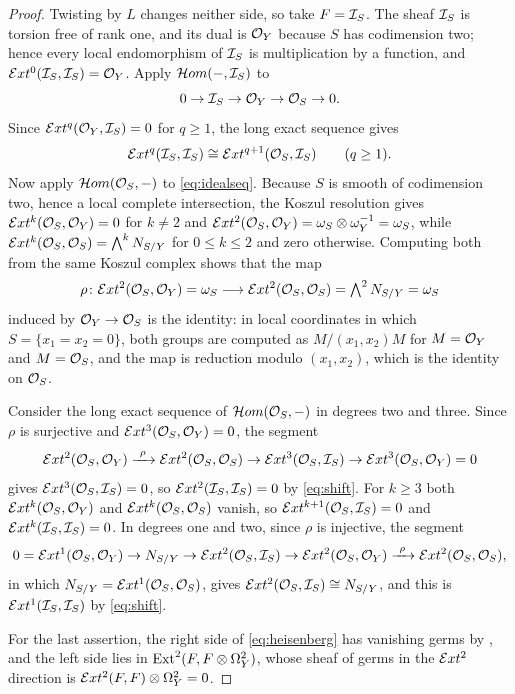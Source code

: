 \begin{proof}
Twisting by $L$ changes neither side, so take $F=\mathcal{I}_{S}$. The sheaf
$\mathcal{I}_{S}$ is torsion free of rank one, and its dual is $\mathcal{O}_{Y}$ because $S$
has codimension two; hence every local endomorphism of $\mathcal{I}_{S}$ is
multiplication by a function, and
$\mathcal{E} xt^{0}(\mathcal{I}_{S},\mathcal{I}_{S})=\mathcal{O}_{Y}$. Apply $\mathcal{H} om(-,\mathcal{I}_{S})$ to
\begin{equation}\label{eq:idealseq}
  0\to\mathcal{I}_{S}\to\mathcal{O}_{Y}\to\mathcal{O}_{S}\to0 .
\end{equation}
Since $\mathcal{E} xt^{q}(\mathcal{O}_{Y},\mathcal{I}_{S})=0$ for $q\ge1$, the long exact sequence
gives
\begin{equation}\label{eq:shift}
  \mathcal{E} xt^{q}(\mathcal{I}_{S},\mathcal{I}_{S})\cong\mathcal{E} xt^{q+1}(\mathcal{O}_{S},\mathcal{I}_{S})
  \qquad(q\ge1).
\end{equation}
Now apply $\mathcal{H} om(\mathcal{O}_{S},-)$ to \eqref{eq:idealseq}. Because $S$ is smooth of
codimension two, hence a local complete intersection, the Koszul resolution
gives $\mathcal{E} xt^{k}(\mathcal{O}_{S},\mathcal{O}_{Y})=0$ for $k\ne2$ and
$\mathcal{E} xt^{2}(\mathcal{O}_{S},\mathcal{O}_{Y})=\omega_{S}\otimes\omega_{Y}^{-1}=\omega_{S}$,
while $\mathcal{E} xt^{k}(\mathcal{O}_{S},\mathcal{O}_{S})=\bigwedge^{k}N_{S/Y}$ for $0\le k\le2$ and
zero otherwise. Computing both from the same Koszul complex shows that the
map
\[
  \rho\colon\mathcal{E} xt^{2}(\mathcal{O}_{S},\mathcal{O}_{Y})=\omega_{S}
  \longrightarrow
  \mathcal{E} xt^{2}(\mathcal{O}_{S},\mathcal{O}_{S})=\textstyle\bigwedge^{2}N_{S/Y}=\omega_{S}
\]
induced by $\mathcal{O}_{Y}\to\mathcal{O}_{S}$ is the identity: in local coordinates in which
$S=\{x_{1}=x_{2}=0\}$, both groups are computed as $M/(x_{1},x_{2})M$ for
$M=\mathcal{O}_{Y}$ and $M=\mathcal{O}_{S}$, and the map is reduction modulo $(x_{1},x_{2})$,
which is the identity on $\mathcal{O}_{S}$.

Consider the long exact sequence of $\mathcal{H} om(\mathcal{O}_{S},-)$ in degrees two and
three. Since $\rho$ is surjective and $\mathcal{E} xt^{3}(\mathcal{O}_{S},\mathcal{O}_{Y})=0$, the
segment
\[
  \mathcal{E} xt^{2}(\mathcal{O}_{S},\mathcal{O}_{Y})\xrightarrow{\ \rho\ }
  \mathcal{E} xt^{2}(\mathcal{O}_{S},\mathcal{O}_{S})\to
  \mathcal{E} xt^{3}(\mathcal{O}_{S},\mathcal{I}_{S})\to
  \mathcal{E} xt^{3}(\mathcal{O}_{S},\mathcal{O}_{Y})=0
\]
gives $\mathcal{E} xt^{3}(\mathcal{O}_{S},\mathcal{I}_{S})=0$, so $\mathcal{E} xt^{2}(\mathcal{I}_{S},\mathcal{I}_{S})=0$ by
\eqref{eq:shift}. For $k\ge3$ both $\mathcal{E} xt^{k}(\mathcal{O}_{S},\mathcal{O}_{Y})$ and
$\mathcal{E} xt^{k}(\mathcal{O}_{S},\mathcal{O}_{S})$ vanish, so
$\mathcal{E} xt^{k+1}(\mathcal{O}_{S},\mathcal{I}_{S})=0$ and $\mathcal{E} xt^{k}(\mathcal{I}_{S},\mathcal{I}_{S})=0$. In
degrees one and two, since $\rho$ is injective, the segment
\[
  0=\mathcal{E} xt^{1}(\mathcal{O}_{S},\mathcal{O}_{Y})\to
  N_{S/Y}\to
  \mathcal{E} xt^{2}(\mathcal{O}_{S},\mathcal{I}_{S})\to
  \mathcal{E} xt^{2}(\mathcal{O}_{S},\mathcal{O}_{Y})\xrightarrow{\ \rho\ }
  \mathcal{E} xt^{2}(\mathcal{O}_{S},\mathcal{O}_{S}),
\]
in which $N_{S/Y}=\mathcal{E} xt^{1}(\mathcal{O}_{S},\mathcal{O}_{S})$, gives
$\mathcal{E} xt^{2}(\mathcal{O}_{S},\mathcal{I}_{S})\cong N_{S/Y}$, and this is
$\mathcal{E} xt^{1}(\mathcal{I}_{S},\mathcal{I}_{S})$ by \eqref{eq:shift}.

For the last assertion, the right side of \eqref{eq:heisenberg} has vanishing
germs by , and the left side lies in
$\operatorname{Ext}^{2}(F,F\otimes\Omega^{2}_{Y})$, whose sheaf of germs in the
$\mathcal{E} xt^{2}$ direction is $\mathcal{E} xt^{2}(F,F)\otimes\Omega^{2}_{Y}=0$.
\end{proof}

